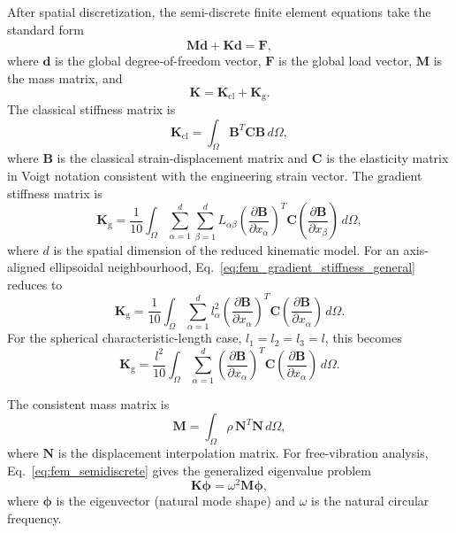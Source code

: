 \documentclass[final,3p,times,fleqn]{elsarticle}
\begin{document}
After spatial discretization, the semi-discrete finite element equations
take the standard form
\begin{equation}
\label{eq:fem_semidiscrete}
\mathbf{M}\ddot{\mathbf{d}}
+
\mathbf{K}\mathbf{d}
=
\mathbf{F},
\end{equation}
where $\mathbf{d}$ is the global degree-of-freedom vector, $\mathbf{F}$ is the global load vector, $\mathbf{M}$ is the mass matrix, and
\begin{equation}
\label{eq:fem_total_stiffness}
\mathbf{K}
=
\mathbf{K}_{\mathrm{cl}}
+
\mathbf{K}_{\mathrm{g}} .
\end{equation}
The classical stiffness matrix is
\begin{equation}
\label{eq:fem_classical_stiffness}
\mathbf{K}_{\mathrm{cl}}
=
\int_{\Omega}\mathbf{B}^{T}\mathbf{C}\mathbf{B}\,d\Omega,
\end{equation}
where $\mathbf{B}$ is the classical strain-displacement matrix and $\mathbf{C}$ is the elasticity matrix in Voigt notation consistent with the engineering strain vector. The
gradient stiffness matrix is
\begin{equation}
\label{eq:fem_gradient_stiffness_general}
\mathbf{K}_{\mathrm{g}}
=
\frac{1}{10}
\int_{\Omega}
\sum_{\alpha=1}^{d}
\sum_{\beta=1}^{d}
L_{\alpha\beta}
\left(\frac{\partial\mathbf{B}}{\partial x_{\alpha}}\right)^{T}
\mathbf{C}
\left(\frac{\partial\mathbf{B}}{\partial x_{\beta}}\right)
\,d\Omega ,
\end{equation}
where $d$ is the spatial dimension of the reduced kinematic model.
For an axis-aligned ellipsoidal neighbourhood,
Eq.~\eqref{eq:fem_gradient_stiffness_general} reduces to
\begin{equation}
\label{eq:fem_gradient_stiffness_aligned}
\mathbf{K}_{\mathrm{g}}
=
\frac{1}{10}
\int_{\Omega}
\sum_{\alpha=1}^{d}
l_{\alpha}^{2}
\left(\frac{\partial\mathbf{B}}{\partial x_{\alpha}}\right)^{T}
\mathbf{C}
\left(\frac{\partial\mathbf{B}}{\partial x_{\alpha}}\right)
\,d\Omega .
\end{equation}
For the spherical characteristic-length case, $l_1=l_2=l_3=l$, this becomes
\begin{equation}
\label{eq:fem_gradient_stiffness_spherical}
\mathbf{K}_{\mathrm{g}}
=
\frac{l^2}{10}
\int_{\Omega}
\sum_{\alpha=1}^{d}
\left(\frac{\partial\mathbf{B}}{\partial x_{\alpha}}\right)^{T}
\mathbf{C}
\left(\frac{\partial\mathbf{B}}{\partial x_{\alpha}}\right)
\,d\Omega .
\end{equation}

The consistent mass matrix is
\begin{equation}
\label{eq:fem_mass_general}
\mathbf{M}
=
\int_{\Omega}
\rho\,\mathbf{N}^{T}\mathbf{N}\,d\Omega ,
\end{equation}
where $\mathbf{N}$ is the displacement interpolation matrix. For
free-vibration analysis, Eq.~\eqref{eq:fem_semidiscrete} gives the
generalized eigenvalue problem
\begin{equation}
\label{eq:fem_eigenproblem_general}
\mathbf{K}\boldsymbol{\phi}
=
\omega^2\mathbf{M}\boldsymbol{\phi},
\end{equation}
where $\boldsymbol{\phi}$ is the eigenvector (natural mode shape) and $\omega$ is the natural circular frequency.
\end{document}
